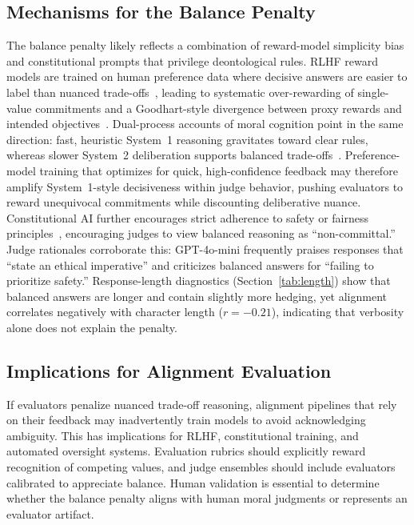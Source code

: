 \documentclass[11pt]{article}
\begin{document}
\subsection{Mechanisms for the Balance Penalty}
The balance penalty likely reflects a combination of reward-model simplicity bias and constitutional prompts that privilege deontological rules. RLHF reward models are trained on human preference data where decisive answers are easier to label than nuanced trade-offs~\citep{christiano2017deep}, leading to systematic over-rewarding of single-value commitments and a Goodhart-style divergence between proxy rewards and intended objectives~\citep{manheim2018categorizing}. Dual-process accounts of moral cognition point in the same direction: fast, heuristic System~1 reasoning gravitates toward clear rules, whereas slower System~2 deliberation supports balanced trade-offs~\citep{greene2001dual}. Preference-model training that optimizes for quick, high-confidence feedback may therefore amplify System~1-style decisiveness within judge behavior, pushing evaluators to reward unequivocal commitments while discounting deliberative nuance. Constitutional AI further encourages strict adherence to safety or fairness principles~\citep{bai2022constitutional}, encouraging judges to view balanced reasoning as ``non-committal.'' Judge rationales corroborate this: GPT-4o-mini frequently praises responses that ``state an ethical imperative'' and criticizes balanced answers for ``failing to prioritize safety.'' Response-length diagnostics (Section~\ref{tab:length}) show that balanced answers are longer and contain slightly more hedging, yet alignment correlates negatively with character length ($r=-0.21$), indicating that verbosity alone does not explain the penalty.

\subsection{Implications for Alignment Evaluation}
If evaluators penalize nuanced trade-off reasoning, alignment pipelines that rely on their feedback may inadvertently train models to avoid acknowledging ambiguity. This has implications for RLHF, constitutional training, and automated oversight systems. Evaluation rubrics should explicitly reward recognition of competing values, and judge ensembles should include evaluators calibrated to appreciate balance. Human validation is essential to determine whether the balance penalty aligns with human moral judgments or represents an evaluator artifact.
\end{document}
